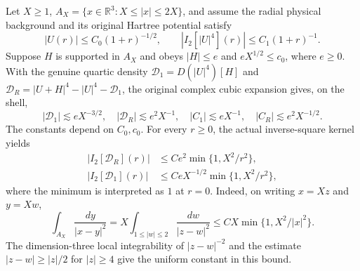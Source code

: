 \documentclass[11pt]{amsart}
\begin{document}
Let $X\ge1$, $A_X=\{x\in\mathbb R^3:X\le|x|\le2X\}$,
and assume the radial physical background and its original
Hartree potential satisfy
\[
 |U(r)|\le C_0(1+r)^{-1/2},\qquad
 |I_2[|U|^4](r)|\le C_1(1+r)^{-1}.
\]
Suppose $H$ is supported in $A_X$ and obeys
$|H|\le e$ and $eX^{1/2}\le c_0$, where $e\ge0$.
With the genuine quartic density
$\mathcal D_1=D(|U|^4)[H]$ and
$\mathcal D_R=|U+H|^4-|U|^4-\mathcal D_1$,
the original complex cubic expansion gives, on the shell,
\[
 |\mathcal D_1|\lesssim eX^{-3/2},\quad
 |\mathcal D_R|\lesssim e^2X^{-1},\quad
 |C_1|\lesssim eX^{-1},\quad
 |C_R|\lesssim e^2X^{-1/2}.
\]
The constants depend on $C_0,c_0$.
For every $r\ge0$, the actual inverse-square kernel yields
\[
 \begin{split}
 |I_2[\mathcal D_R](r)|
 &\le C e^2\min\{1,X^2/r^2\},\\
 |I_2[\mathcal D_1](r)|
 &\le C eX^{-1/2}\min\{1,X^2/r^2\},
 \end{split}
\]
where the minimum is interpreted as $1$ at $r=0$.
Indeed, on writing $x=Xz$ and $y=Xw$,
\[
 \int_{A_X}\frac{dy}{|x-y|^2}
 =X\int_{1\le|w|\le2}\frac{dw}{|z-w|^2}
 \le C X \min\{1,X^2/|x|^2\}.
\]
The dimension-three local integrability of $|z-w|^{-2}$
and the estimate $|z-w|\ge |z|/2$ for $|z|\ge4$
give the uniform constant in this bound.
\end{document}
